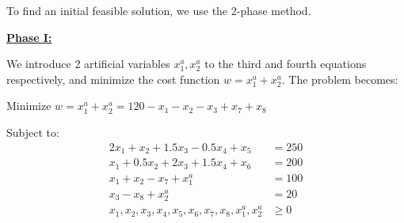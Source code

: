 \documentclass{article}
\begin{document}
\noindent
To find an initial feasible solution, we use the 2-phase method.
\newline

\noindent
\textbf{\underline{Phase I:}}

We introduce 2 artificial variables $x_1^a, x_2^a$ to the third and fourth equations respectively, and minimize the cost function $w=x_1^a + x_2^a$. The problem becomes:

\begin{center}
  Minimize $w = x_1^a + x_2^a = 120 -x_1 -x_2 -x_3 +x_7 + x_8$
\end{center}

Subject to:
\begin{align*}
  2x_1 + x_2    + 1.5x_3   - 0.5x_4  + x_5                                  &= 250 \\
  x_1  + 0.5x_2 + 2x_3     + 1.5x_4       + x_6                             &= 200  \\
  x_1  + x_2                                    - x_7       + x_1^a         &= 100 \\
                  x_3                                 - x_8         + x_2^a &= 20 \\
  x_1, x_2, x_3, x_4, x_5, x_6, x_7, x_8, x_1^a, x_2^a &\geq 0
\end{align*}
\newline
\end{document}
